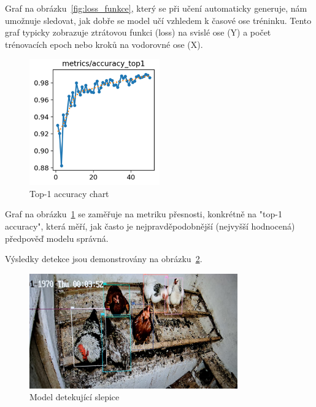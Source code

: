 Graf na obrázku~\ref{fig:loss_funkce}, který se při učení automaticky generuje, nám umožnuje sledovat, jak dobře se model učí vzhledem k časové ose tréninku.
Tento graf typicky zobrazuje ztrátovou funkci (loss) na svislé ose (Y) a počet trénovacích epoch nebo kroků na vodorovné ose (X).

\begin{figure}[htbp]
    \centering
    \includegraphics[width=0.5\textwidth]{img/top1_accuracy}
    \caption{Top-1 accuracy chart}
    \label{fig:top1_accuracy}
\end{figure}

Graf na obrázku~\ref{fig:top1_accuracy} se zaměřuje na metriku přesnosti, konkrétně na
"top-1 accuracy", která měří, jak často je nejpravděpodobnější (nejvyšší hodnocená) předpověď modelu správná.

Výsledky detekce jsou demonstrovány na obrázku~\ref{fig:detekce_slepic}.

\begin{figure}[htbp]
    \centering
    \includegraphics[width=0.8\textwidth]{img/detekce_slepic}
    \caption{Model detekující slepice}
    \label{fig:detekce_slepic}
\end{figure}
